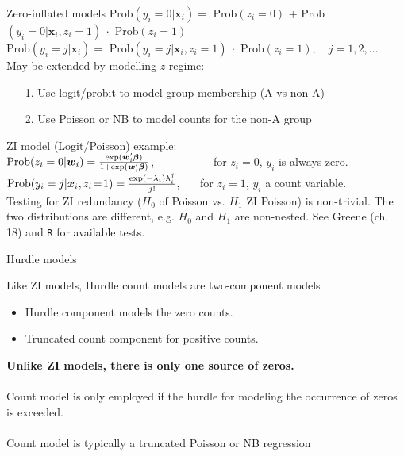 \documentclass[usenames,dvipsnames]{beamer}
\begin{document}
\begin{frame}{Zero-inflated models}
\small{Prob$(y_i=0|\bm{x}_i) = $ Prob$(z_i\!=\!0)$ +  Prob$(y_i=0|\bm{x}_i, z_i\!=\!1)~\cdot$ Prob$(z_i\!=\!1)$}\\
\small{Prob$(y_i=j|\bm{x}_i) =$ Prob$(y_i=j|\bm{x}_i, z_i\!=\!1)~\cdot$ Prob$(z_i\!=\!1),\quad j=1,2,\dots$}\\
\medskip
May be extended by modelling $z$-regime:
\begin{itemize}
\item[1.] Use logit/probit to model group membership (A vs non-A)
\item[2.] Use Poisson or NB to model counts for the  non-A group\\
\end{itemize}
\medskip
ZI model (Logit/Poisson) example:\\
\medskip
$\textnormal{Prob}(z_i=0|\bm{w}_i) = \frac{\exp(\bm{w}_i^{\prime}\bm{\beta})}{1+\exp(\bm{w}_i^{\prime}\bm{\beta})}$, ~~~~~~~~~~for $z_i = 0$, $y_i$ is always zero.\\
\medskip
$\textnormal{Prob}(y_i=j|\bm{x}_i,z_i\!=\!1) = \frac{\exp(-\lambda_i)\lambda_i^j}{j!}$, ~~~for $z_i = 1$, $y_i$ a count variable.\\
\bigskip
Testing for ZI redundancy ($H_0$ of Poisson vs. $H_1$ ZI Poisson) is non-trivial. The two distributions are different, e.g. $H_0$ and $H_1$ are non-nested. See Greene (ch. 18) and \texttt{R} for available tests.
\end{frame}
\begin{frame}{Hurdle models}

Like ZI models, Hurdle count models are two-component models\\
\bigskip
\begin{itemize}
    \item Hurdle component models the zero counts.
    \item Truncated count component for positive counts.
\end{itemize}
\bigskip
\textbf{Unlike ZI models, there is only one source of zeros.}\\
~\\
Count model is only employed if the hurdle for modeling the occurrence of zeros is exceeded. \\
~\\
Count model is typically a truncated Poisson or NB regression
\end{frame}
\end{document}
